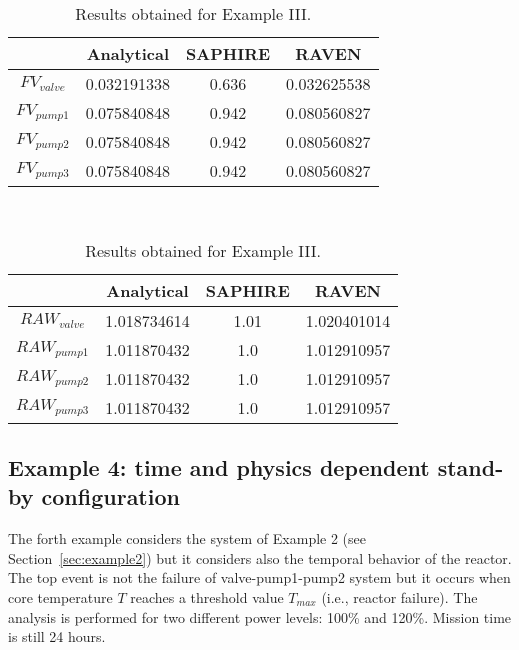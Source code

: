 \begin{table}
    \caption{Results obtained for Example III.}
    \begin{minipage}{.5\linewidth}
      \centering
      \begin{tabular}{c | c | c | c} 
        \hline 
         & Analytical & SAPHIRE & RAVEN \\ 
        \hline 
        $FV_{valve}$ & 0.032191338 & 0.636 & 0.032625538  \\
        $FV_{pump1}$ & 0.075840848 & 0.942 & 0.080560827  \\
        $FV_{pump2}$ & 0.075840848 & 0.942 & 0.080560827  \\
        $FV_{pump3}$ & 0.075840848 & 0.942 & 0.080560827  \\ 
        \hline 
      \end{tabular}
    \end{minipage} \\
    \begin{minipage}{.5\linewidth}
      \centering
      \begin{tabular}{c | c | c | c} 
        \hline 
         & Analytical & SAPHIRE & RAVEN \\ 
        \hline 
        $RAW_{valve}$ & 1.018734614 & 1.01 & 1.020401014 \\
        $RAW_{pump1}$ & 1.011870432 & 1.0 & 1.012910957  \\
        $RAW_{pump2}$ & 1.011870432 & 1.0 & 1.012910957  \\
        $RAW_{pump3}$ & 1.011870432 & 1.0 & 1.012910957  \\ 
        \hline 
      \end{tabular}
    \end{minipage} 
    \label{tab:example3}
\end{table}


\subsection{Example 4: time and physics dependent stand-by configuration}
\label{sec:example4}

The forth example considers the system of Example 2 (see Section~\ref{sec:example2}) but it considers 
also the temporal behavior of the reactor.
The top event is not the failure of valve-pump1-pump2 system but it occurs when core temperature $T$
reaches a threshold value $T_{max}$ (i.e., reactor failure). 
The analysis is performed for two different power levels: 100\% and 120\%.
Mission time is still 24 hours.


